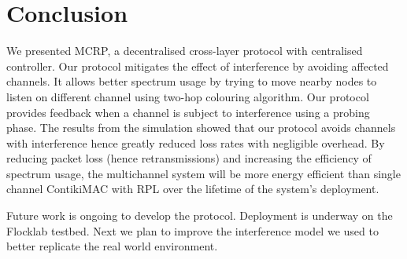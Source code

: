 \section{Conclusion}
\label{sec:conclusion}
We presented MCRP, a decentralised cross-layer protocol with centralised controller. Our protocol mitigates the effect of interference by avoiding affected channels. It allows better spectrum usage by trying to move nearby nodes to listen on different channel using two-hop colouring algorithm. Our protocol provides feedback when a channel is subject to interference using a probing phase.
The results from the simulation showed that our protocol avoids channels with interference hence greatly reduced loss rates with negligible overhead. By reducing packet loss (hence retransmissions) and increasing the efficiency of spectrum usage, the multichannel system will be more energy efficient than single channel ContikiMAC with RPL over the lifetime of the system's deployment.

Future work is ongoing to develop the protocol. Deployment is underway on the Flocklab testbed\cite{flocklab}. Next we plan to improve the interference model we used to better replicate the real world environment. 

